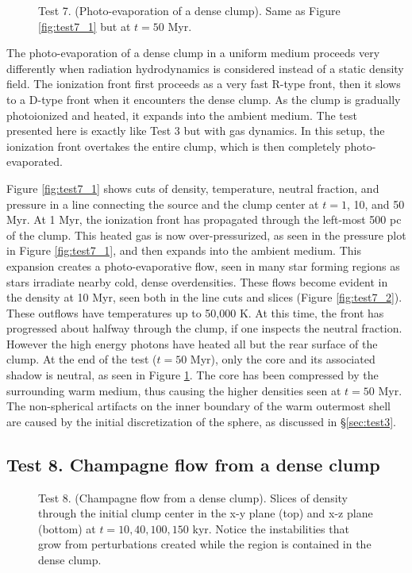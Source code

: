 \documentclass[apj,onecolumn]{emulateapj}
\begin{document}
\begin{figure}[t]
  \caption{\label{fig:test7_3} Test 7. (Photo-evaporation of a dense
    clump).  Same as Figure \ref{fig:test7_1} but at $t = 50$ Myr.}
\end{figure}

The photo-evaporation of a dense clump in a uniform medium proceeds
very differently when radiation hydrodynamics is considered instead of
a static density field.  The ionization front first proceeds as a very
fast R-type front, then it slows to a D-type front when it encounters
the dense clump.  As the clump is gradually photoionized and heated,
it expands into the ambient medium.  The test presented here is
exactly like Test 3 but with gas dynamics.  In this setup, the
ionization front overtakes the entire clump, which is then completely
photo-evaporated.

Figure \ref{fig:test7_1} shows cuts of density, temperature, neutral
fraction, and pressure in a line connecting the source and the clump
center at $t = 1$, 10, and 50 Myr.  At 1 Myr, the ionization front has
propagated through the left-most 500 pc of the clump.  This heated gas
is now over-pressurized, as seen in the pressure plot in Figure
\ref{fig:test7_1}, and then expands into the ambient medium.  This
expansion creates a photo-evaporative flow, seen in many star forming
regions \citep[e.g. M16][]{Hester96} as stars irradiate
nearby cold, dense overdensities.  These flows become evident in the
density at 10 Myr, seen both in the line cuts and slices (Figure
\ref{fig:test7_2}).  These outflows have temperatures up to 50,000 K.
At this time, the front has progressed about halfway through the
clump, if one inspects the neutral fraction.  However the high energy
photons have heated all but the rear surface of the clump.  At the end
of the test ($t = 50$ Myr), only the core and its associated shadow is
neutral, as seen in Figure \ref{fig:test7_3}.  The core has been
compressed by the surrounding warm medium, thus causing the higher
densities seen at $t = 50$ Myr.  The non-spherical artifacts on the
inner boundary of the warm outermost shell are caused by the initial
discretization of the sphere, as discussed in \S\ref{sec:test3}.

\subsection{Test 8. Champagne flow from a dense clump}

\begin{figure}[t]
  \caption{\label{fig:test8_1} Test 8. (Champagne flow from a dense
    clump).  Slices of density through the initial clump center in the
    x-y plane (top) and x-z plane (bottom) at $t = 10, 40, 100, 150$
    kyr.  Notice the instabilities that grow from perturbations
    created while the  region is contained in the dense
    clump.}
\end{figure}
\end{document}
